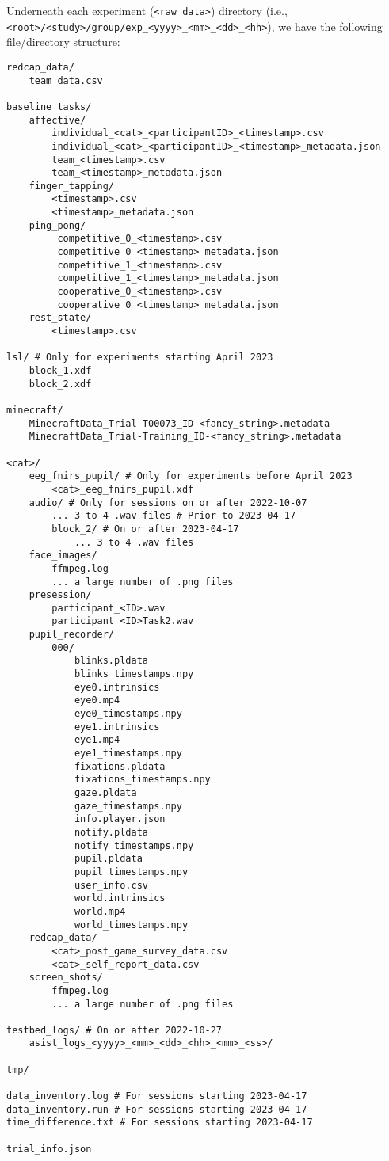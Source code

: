 Underneath each experiment (\verb|<raw_data>|) directory (i.e.,\\
\verb|<root>/<study>/group/exp_<yyyy>_<mm>_<dd>_<hh>|), we have the following
file/directory structure:
%
\begin{verbatim}
redcap_data/
    team_data.csv

baseline_tasks/
    affective/
        individual_<cat>_<participantID>_<timestamp>.csv
        individual_<cat>_<participantID>_<timestamp>_metadata.json
        team_<timestamp>.csv
        team_<timestamp>_metadata.json
    finger_tapping/
        <timestamp>.csv
        <timestamp>_metadata.json
    ping_pong/
         competitive_0_<timestamp>.csv
         competitive_0_<timestamp>_metadata.json
         competitive_1_<timestamp>.csv
         competitive_1_<timestamp>_metadata.json
         cooperative_0_<timestamp>.csv
         cooperative_0_<timestamp>_metadata.json
    rest_state/
        <timestamp>.csv

lsl/ # Only for experiments starting April 2023
    block_1.xdf
    block_2.xdf

minecraft/
    MinecraftData_Trial-T00073_ID-<fancy_string>.metadata
    MinecraftData_Trial-Training_ID-<fancy_string>.metadata

<cat>/
    eeg_fnirs_pupil/ # Only for experiments before April 2023
        <cat>_eeg_fnirs_pupil.xdf
    audio/ # Only for sessions on or after 2022-10-07
        ... 3 to 4 .wav files # Prior to 2023-04-17
        block_2/ # On or after 2023-04-17
            ... 3 to 4 .wav files
    face_images/
        ffmpeg.log
        ... a large number of .png files
    presession/
        participant_<ID>.wav
        participant_<ID>Task2.wav
    pupil_recorder/
        000/
            blinks.pldata
            blinks_timestamps.npy
            eye0.intrinsics
            eye0.mp4
            eye0_timestamps.npy
            eye1.intrinsics
            eye1.mp4
            eye1_timestamps.npy
            fixations.pldata
            fixations_timestamps.npy
            gaze.pldata
            gaze_timestamps.npy
            info.player.json
            notify.pldata
            notify_timestamps.npy
            pupil.pldata
            pupil_timestamps.npy
            user_info.csv
            world.intrinsics
            world.mp4
            world_timestamps.npy
    redcap_data/
        <cat>_post_game_survey_data.csv
        <cat>_self_report_data.csv
    screen_shots/
        ffmpeg.log
        ... a large number of .png files

testbed_logs/ # On or after 2022-10-27
    asist_logs_<yyyy>_<mm>_<dd>_<hh>_<mm>_<ss>/

tmp/

data_inventory.log # For sessions starting 2023-04-17
data_inventory.run # For sessions starting 2023-04-17
time_difference.txt # For sessions starting 2023-04-17

trial_info.json
\end{verbatim}

